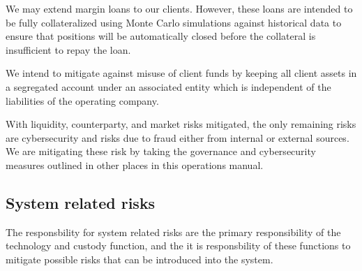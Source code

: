We may extend margin loans to our clients. However,
these loans are intended to be fully collateralized using Monte Carlo
simulations against historical data to ensure that positions will be
automatically closed before the collateral is insufficient to repay
the loan.

We intend to mitigate against misuse of client funds by keeping all
client assets in a segregated account under an associated entity which
is independent of the liabilities of the operating company.

With liquidity, counterparty, and market risks mitigated, the only
remaining risks are cybersecurity and risks due to fraud either from
internal or external sources.  We are mitigating these risk by taking
the governance and cybersecurity measures outlined in other places in
this operations manual.

\subsection{System related risks}
The responsbility for system related risks are the primary
responsibility of the technology and custody function, and the it is
responsbility of these functions to mitigate possible risks that can
be introduced into the system.
